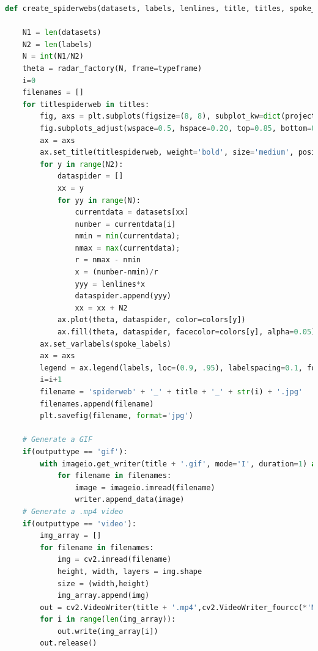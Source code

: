 \clearpage
\begin{lstlisting}[language=Python, caption=Generación de graficos de radar, label=lst:c3]
def create_spiderwebs(datasets, labels, lenlines, title, titles, spoke_labels, colors, typeframe, outputtype):

    N1 = len(datasets)
    N2 = len(labels)
    N = int(N1/N2)
    theta = radar_factory(N, frame=typeframe)
    i=0
    filenames = []
    for titlespiderweb in titles:
        fig, axs = plt.subplots(figsize=(8, 8), subplot_kw=dict(projection='radar'))
        fig.subplots_adjust(wspace=0.5, hspace=0.20, top=0.85, bottom=0.05)
        ax = axs
        ax.set_title(titlespiderweb, weight='bold', size='medium', position=(0.5, 0.5), horizontalalignment='center', verticalalignment='center', fontsize=16)
        for y in range(N2):
            dataspider = []
            xx = y
            for yy in range(N):
                currentdata = datasets[xx]
                number = currentdata[i]
                nmin = min(currentdata);
                nmax = max(currentdata);
                r = nmax - nmin
                x = (number-nmin)/r
                yyy = lenlines*x
                dataspider.append(yyy)
                xx = xx + N2
            ax.plot(theta, dataspider, color=colors[y])
            ax.fill(theta, dataspider, facecolor=colors[y], alpha=0.05)
        ax.set_varlabels(spoke_labels)
        ax = axs
        legend = ax.legend(labels, loc=(0.9, .95), labelspacing=0.1, fontsize='small')
        i=i+1
        filename = 'spiderweb' + '_' + title + '_' + str(i) + '.jpg'
        filenames.append(filename)
        plt.savefig(filename, format='jpg')
    
    # Generate a GIF
    if(outputtype == 'gif'):
        with imageio.get_writer(title + '.gif', mode='I', duration=1) as writer:
            for filename in filenames:
                image = imageio.imread(filename)
                writer.append_data(image)
    # Generate a .mp4 video
    if(outputtype == 'video'):
        img_array = []
        for filename in filenames:
            img = cv2.imread(filename)
            height, width, layers = img.shape
            size = (width,height)
            img_array.append(img)        
        out = cv2.VideoWriter(title + '.mp4',cv2.VideoWriter_fourcc(*'MP4V'), 1, size)
        for i in range(len(img_array)):
            out.write(img_array[i])
        out.release()
\end{lstlisting}

